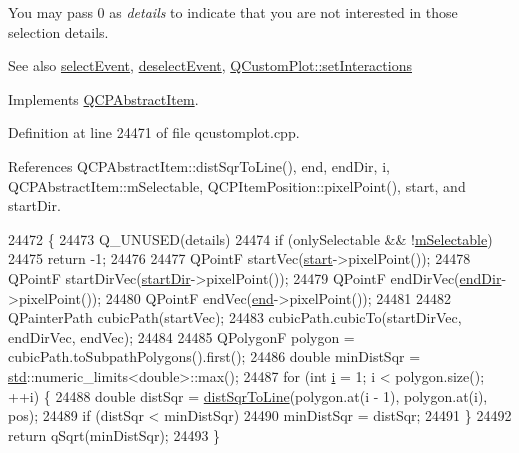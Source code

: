 You may pass 0 as {\itshape details} to indicate that you are not interested in those selection details.

\begin{DoxySeeAlso}{See also}
\hyperlink{class_q_c_p_abstract_item_aaf92af7b9893712959a6c073d334d88d}{select\+Event}, \hyperlink{class_q_c_p_abstract_item_a91f090d6763cfedb0749219c63788ae9}{deselect\+Event}, \hyperlink{class_q_custom_plot_a5ee1e2f6ae27419deca53e75907c27e5}{Q\+Custom\+Plot\+::set\+Interactions} 
\end{DoxySeeAlso}


Implements \hyperlink{class_q_c_p_abstract_item_a96d522d10ffc0413b9a366c6f7f0476b}{Q\+C\+P\+Abstract\+Item}.



Definition at line 24471 of file qcustomplot.\+cpp.



References Q\+C\+P\+Abstract\+Item\+::dist\+Sqr\+To\+Line(), end, end\+Dir, i, Q\+C\+P\+Abstract\+Item\+::m\+Selectable, Q\+C\+P\+Item\+Position\+::pixel\+Point(), start, and start\+Dir.


\begin{DoxyCode}
24472                                                          \{
24473   Q\_UNUSED(details)
24474   if (onlySelectable && !\hyperlink{class_q_c_p_abstract_item_ad81eb35c8726a0f458db9df9732e0e41}{mSelectable})
24475     return -1;
24476 
24477   QPointF startVec(\hyperlink{class_q_c_p_item_curve_a20c3b5ea31c33764f4f30c2ec7ae518b}{start}->pixelPoint());
24478   QPointF startDirVec(\hyperlink{class_q_c_p_item_curve_aa124bf66c09cc51c627fb49db8bf8a7b}{startDir}->pixelPoint());
24479   QPointF endDirVec(\hyperlink{class_q_c_p_item_curve_a28181a9dee9cc3c3da83a883221bd2d0}{endDir}->pixelPoint());
24480   QPointF endVec(\hyperlink{class_q_c_p_item_curve_a24ecbb195b32a08b42b61c2cf08a1b4d}{end}->pixelPoint());
24481 
24482   QPainterPath cubicPath(startVec);
24483   cubicPath.cubicTo(startDirVec, endDirVec, endVec);
24484 
24485   QPolygonF polygon = cubicPath.toSubpathPolygons().first();
24486   \textcolor{keywordtype}{double} minDistSqr = \hyperlink{namespacestd}{std}::numeric\_limits<\textcolor{keywordtype}{double}>::max();
24487   for (\textcolor{keywordtype}{int} \hyperlink{_comparision_pictures_2_createtest_image_8m_a6f6ccfcf58b31cb6412107d9d5281426}{i} = 1; i < polygon.size(); ++i) \{
24488     \textcolor{keywordtype}{double} distSqr = \hyperlink{class_q_c_p_abstract_item_acdca343717d625b8abb3c3e38c0ed39d}{distSqrToLine}(polygon.at(i - 1), polygon.at(i), pos);
24489     \textcolor{keywordflow}{if} (distSqr < minDistSqr)
24490       minDistSqr = distSqr;
24491   \}
24492   \textcolor{keywordflow}{return} qSqrt(minDistSqr);
24493 \}
\end{DoxyCode}


